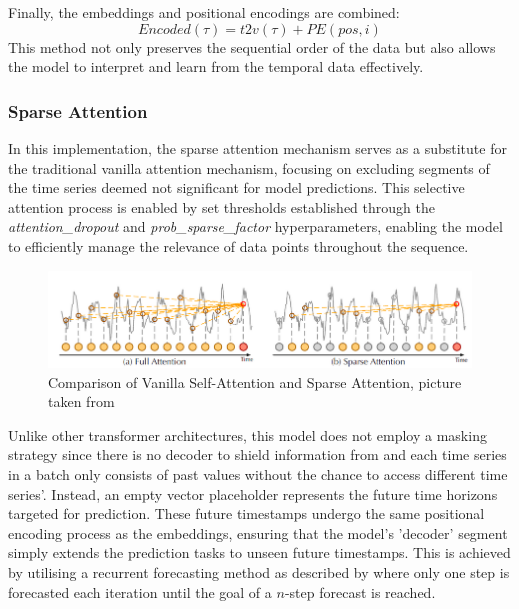 \documentclass{article}
\begin{document}
Finally, the embeddings and positional encodings are combined:
\begin{equation}
    Encoded(\tau) = t2v(\tau) + PE(pos, i)
\end{equation}
This method not only preserves the sequential order of the data but also allows the model to interpret and learn from the temporal data effectively.


\subsubsection{Sparse Attention}

In this implementation, the sparse attention mechanism serves as a substitute for the traditional vanilla attention mechanism, focusing on excluding segments of the time series deemed not significant for model predictions. This selective attention process is enabled by set thresholds established through the \textit{attention\_dropout} and \textit{prob\_sparse\_factor} hyperparameters, enabling the model to efficiently manage the relevance of data points throughout the sequence.

\begin{figure}
    \centering
    \includegraphics[width=\linewidth]{graphs/models/Sparse_Attention_Example.png}
    \caption{Comparison of Vanilla Self-Attention and Sparse Attention, picture taken from \cite{Informer}}
    \label{fig:sparse_attention}
\end{figure}

Unlike other transformer architectures, this model does not employ a masking strategy since there is no decoder to shield information from and each time series in a batch only consists of past values without the chance to access different time series'. Instead, an empty vector placeholder represents the future time horizons targeted for prediction. These future timestamps undergo the same positional encoding process as the embeddings, ensuring that the model's 'decoder' segment simply extends the prediction tasks to unseen future timestamps. This is achieved by utilising a recurrent forecasting method as described by \cite{recurrent_forecasting} where only one step is forecasted each iteration until the goal of a $n$-step forecast is reached.
\end{document}
